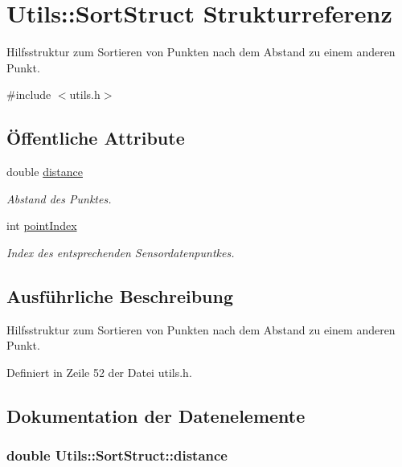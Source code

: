 \hypertarget{structUtils_1_1SortStruct}{\section{Utils\-:\-:Sort\-Struct Strukturreferenz}
\label{structUtils_1_1SortStruct}
}


Hilfsstruktur zum Sortieren von Punkten nach dem Abstand zu einem anderen Punkt.  




{\ttfamily \#include $<$utils.\-h$>$}

\subsection*{Öffentliche Attribute}
\begin{DoxyCompactItemize}
\item 
double \hyperlink{structUtils_1_1SortStruct_aca911abd52b034a588bab7b414cf93cb}{distance}
\begin{DoxyCompactList}\small\item\em Abstand des Punktes. \end{DoxyCompactList}\item 
int \hyperlink{structUtils_1_1SortStruct_ad470a3f9a230e66a47fd022bf7a4a70e}{point\-Index}
\begin{DoxyCompactList}\small\item\em Index des entsprechenden Sensordatenpuntkes. \end{DoxyCompactList}\end{DoxyCompactItemize}


\subsection{Ausführliche Beschreibung}
Hilfsstruktur zum Sortieren von Punkten nach dem Abstand zu einem anderen Punkt. 

Definiert in Zeile 52 der Datei utils.\-h.



\subsection{Dokumentation der Datenelemente}
\hypertarget{structUtils_1_1SortStruct_aca911abd52b034a588bab7b414cf93cb}{
\subsubsection[{distance}]{\setlength{\rightskip}{0pt plus 5cm}double Utils\-::\-Sort\-Struct\-::distance}}\label{structUtils_1_1SortStruct_aca911abd52b034a588bab7b414cf93cb}


